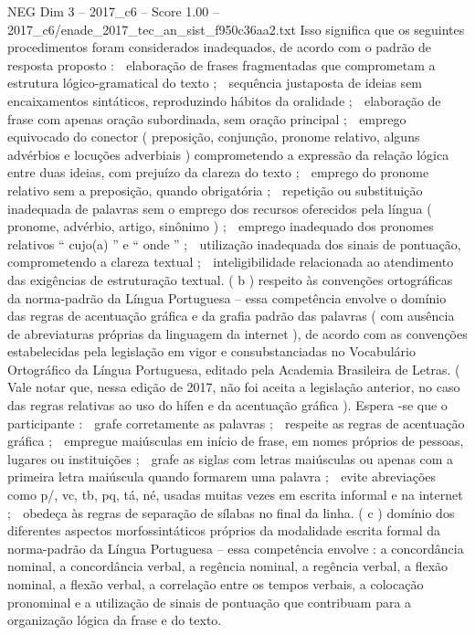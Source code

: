 \begin{textsample}{NEG Dim 3 – 2017\_c6 – Score 1.00 – 2017\_c6/enade\_2017\_tec\_an\_sist\_f950c36aa2.txt}
Isso significa que os seguintes procedimentos foram considerados inadequados, de acordo com o padrão de resposta proposto :  elaboração de frases fragmentadas que comprometam a estrutura lógico-gramatical do texto ;  sequência justaposta de ideias sem encaixamentos sintáticos, reproduzindo hábitos da oralidade ;  elaboração de frase com apenas oração subordinada, sem oração principal ;  emprego equivocado do conector ( preposição, conjunção, pronome relativo, alguns advérbios e locuções adverbiais ) comprometendo a expressão da relação lógica entre duas ideias, com prejuízo da clareza do texto ;  emprego do pronome relativo sem a preposição, quando obrigatória ;  repetição ou substituição inadequada de palavras sem o emprego dos recursos oferecidos pela língua ( pronome, advérbio, artigo, sinônimo ) ;  emprego inadequado dos pronomes relativos “ cujo(a) ” e “ onde ” ;  utilização inadequada dos sinais de pontuação, comprometendo a clareza textual ;  inteligibilidade relacionada ao atendimento das exigências de estruturação textual. ( b ) respeito às convenções ortográficas da norma-padrão da Língua Portuguesa – essa competência envolve o domínio das regras de acentuação gráfica e da grafia padrão das palavras ( com ausência de abreviaturas próprias da linguagem da internet ), de acordo com as convenções estabelecidas pela legislação em vigor e consubstanciadas no Vocabulário Ortográfico da Língua Portuguesa, editado pela Academia Brasileira de Letras. ( Vale notar que, nessa edição de 2017, não foi aceita a legislação anterior, no caso das regras relativas ao uso do hífen e da acentuação gráfica ).
Espera -se que o participante :  grafe corretamente as palavras ;  respeite as regras de acentuação gráfica ;  empregue maiúsculas em início de frase, em nomes próprios de pessoas, lugares ou instituições ;  grafe as siglas com letras maiúsculas ou apenas com a primeira letra maiúscula quando formarem uma palavra ;  evite abreviações como p/, vc, tb, pq, tá, né, usadas muitas vezes em escrita informal e na internet ;  obedeça às regras de separação de sílabas no final da linha. ( c ) domínio dos diferentes aspectos morfossintáticos próprios da modalidade escrita formal da norma-padrão da Língua Portuguesa – essa competência envolve : a concordância nominal, a concordância verbal, a regência nominal, a regência verbal, a flexão nominal, a flexão verbal, a correlação entre os tempos verbais, a colocação pronominal e a utilização de sinais de pontuação que contribuam para a organização lógica da frase e do texto.

\end{textsample}
